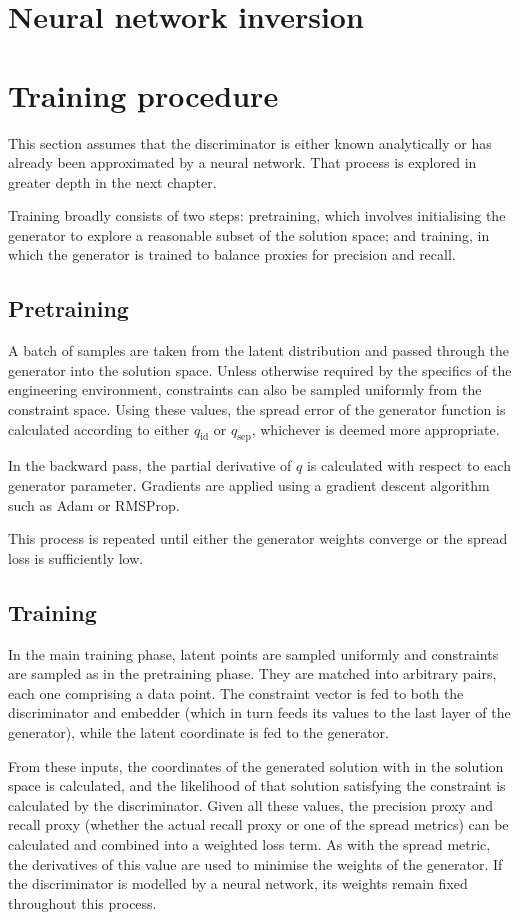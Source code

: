 \documentclass[../../main.tex]{subfiles}
\begin{document}
\section{Neural network inversion}

\section{Training procedure}

This section assumes that the discriminator is either known analytically or has already been approximated by a neural network.
That process is explored in greater depth in the next chapter.

Training broadly consists of two steps: pretraining, which involves initialising the generator to explore a reasonable subset of the solution space; and training, in which the generator is trained to balance proxies for precision and recall.

\subsection{Pretraining}

A batch of samples are taken from the latent distribution and passed through the generator into the solution space.
Unless otherwise required by the specifics of the engineering environment, constraints can also be sampled uniformly from the constraint space.
Using these values, the spread error of the generator function is calculated according to either $q_\text{id}$ or $q_\text{sep}$, whichever is deemed more appropriate.

In the backward pass, the partial derivative of $q$ is calculated with respect to each generator parameter.
Gradients are applied using a gradient descent algorithm such as Adam or RMSProp.

This process is repeated until either the generator weights converge or the spread loss is sufficiently low.

\subsection{Training}

In the main training phase, latent points are sampled uniformly and constraints are sampled as in the pretraining phase.
They are matched into arbitrary pairs, each one comprising a data point.
The constraint vector is fed to both the discriminator and embedder (which in turn feeds its values to the last layer of the generator), while the latent coordinate is fed to the generator.

From these inputs, the coordinates of the generated solution with in the solution space is calculated, and the likelihood of that solution satisfying the constraint is calculated by the discriminator.
Given all these values, the precision proxy and recall proxy (whether the actual recall proxy or one of the spread metrics) can be calculated and combined into a weighted loss term.
As with the spread metric, the derivatives of this value are used to minimise the weights of the generator.
If the discriminator is modelled by a neural network, its weights remain fixed throughout this process.
\end{document}
